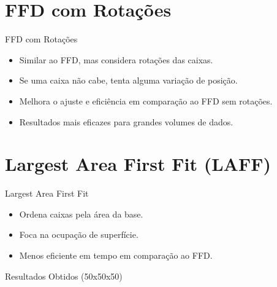 \documentclass{beamer}
\begin{document}
\section{FFD com Rotações}
\begin{frame}{FFD com Rotações}
	\begin{itemize}
		\item Similar ao FFD, mas considera rotações das caixas.
		\item Se uma caixa não cabe, tenta alguma variação de posição.
		\item Melhora o ajuste e eficiência em comparação ao FFD sem rotações.
		\item Resultados mais eficazes para grandes volumes de dados.
	\end{itemize}
\end{frame}

\section{Largest Area First Fit (LAFF)}
\begin{frame}{Largest Area First Fit}
	\begin{itemize}
		\item Ordena caixas pela área da base.
		\item Foca na ocupação de superfície.
		\item Menos eficiente em tempo em comparação ao FFD.
	\end{itemize}
\end{frame}

\begin{frame}{Resultados Obtidos (50x50x50)}
	\begin{table}[]
		\centering
		\caption{Container 50x50x50 com 30 caixas}
	\end{table}
\end{frame}
\end{document}
